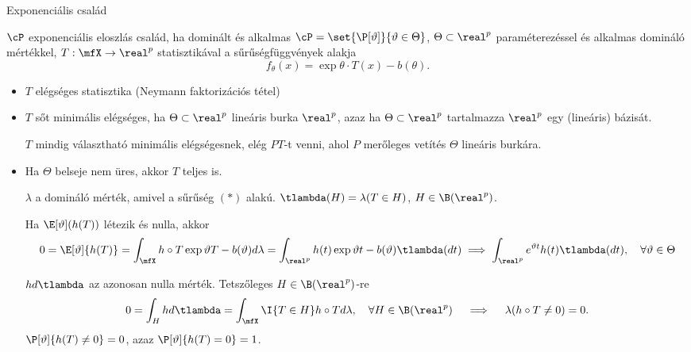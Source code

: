 \documentclass[aspectratio=169,notheorems,9pt,\option]{beamer}
\begin{document}
\begin{frame}{Exponenciális család}
  \begin{df}
    $\cP$ exponenciális eloszlás család, ha dominált és alkalmas 
    $\cP=\set{\P[\theta]}{\theta\in\Theta}$, $\Theta\subset\real^p$ paraméterezéssel 
    és alkalmas domináló mértékkel, $T:\mfX\to\real^p$ statisztikával 
    a sűrűségfüggvények alakja 
    \begin{displaymath}
      f_{\theta} (x) =\exp{\theta\cdot T(x)-b (\theta)}.\tag{*}
    \end{displaymath}
  \end{df}
  \begin{itemize}
  \item $T$ elégséges statisztika (Neymann faktorizációs tétel)
  \item $T$ sőt minimális elégséges, ha $\Theta\subset\real^p$ lineáris burka $\real^p$, 
  azaz ha $\Theta\subset\real^p$ tartalmazza $\real^p$ egy (lineáris) bázisát.
  

  $T$ mindig választható minimális elégségesnek, elég $P T$-t venni, ahol $P$ merőleges 
  vetítés  $\Theta$ lineáris burkára.

  \item Ha $\Theta$ belseje nem üres, akkor $T$ teljes is.
  
  $\lambda$ a domináló mérték, amivel a sűrűség $(*)$ alakú. $\tlambda(H)=\lambda(T\in H)$, $H\in\B(\real^p)$.

  Ha $\E[\theta](h(T))$ létezik és nulla, akkor
  \begin{displaymath}
    0=\E[\theta]{h(T)}=\int_{\mfX} h\circ T \exp{\theta T-b(\theta)}d\lambda 
    =\int_{\real^p} h(t) \exp{\theta t-b(\theta)}\tlambda(d t)
    \implies \int_{\real^p} e^{\theta t} h(t)\tlambda(d t),\quad \forall \theta\in\Theta
  \end{displaymath}

  $h d\tlambda$ az azonosan nulla mérték. Tetszőleges $H\in\B(\real^p)$-re
  \begin{displaymath}
    0=\int_H h d\tlambda=\int_{\mfX} \I{T\in H} h\circ T d\lambda,\quad
    \forall  H\in\B(\real^p)
    \quad\implies\quad \lambda(h\circ T\neq0)=0. 
  \end{displaymath}
  $\P[\theta]{h(T)\neq 0}=0$, azaz $\P[\theta]{h(T)=0}=1$.
  

\end{itemize}
\end{frame}
\end{document}
